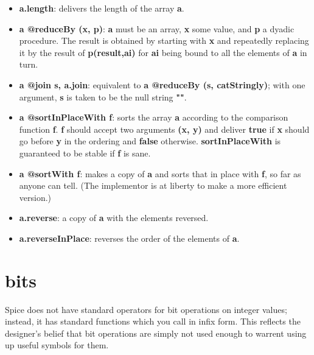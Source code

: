 \documentclass{report}
\begin{document}
\begin{itemize}\item {\bf a.length}: delivers the length of the array {\bf a}.

\item {\bf a @reduceBy (x, p)}: {\bf a} must be an array, {\bf x} some value, and {\bf p} a dyadic
procedure. The result is obtained by starting with {\bf x} and repeatedly
replacing it by the result of {\bf p(result,ai)} for {\bf ai} being bound to all the
elements of {\bf a} in turn.

\item {\bf a @join s, a.join}: equivalent to {\bf a @reduceBy (s, catStringly)}; with one
argument, {\bf s} is taken to be the null string {\bf ""}.

\item {\bf a @sortInPlaceWith f}: sorts the array {\bf a} according to the comparison
function {\bf f}. {\bf f} should accept two arguments {\bf (x, y)} and deliver
{\bf true} if {\bf x} should go before {\bf y} in the ordering and {\bf false}
otherwise. {\bf sortInPlaceWith} is guaranteed to be stable if {\bf f} is
sane.

\item {\bf a @sortWith f}: makes a copy of {\bf a} and sorts that in place with {\bf f},
so far as anyone can tell. (The implementor is at liberty to make a
more efficient version.)

\item {\bf a.reverse}: a copy of {\bf a} with the elements reversed.

\item {\bf a.reverseInPlace}: reverses the order of the elements of {\bf a}.

\end{itemize}\section{bits}


Spice does not have standard operators for bit operations on integer values;
instead, it has standard functions which you call in infix form. This reflects
the designer's belief that bit operations are simply not used enough to
warrent using up useful symbols for them.
\end{document}
